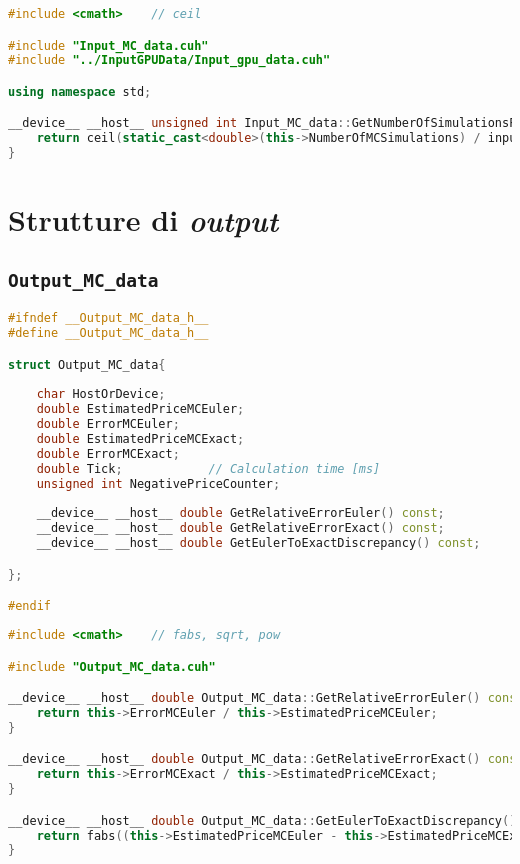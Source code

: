 \begin{lstlisting}[language=C++, caption={\texttt{libraries/InputStructures/InputMCData/Input\_MC\_data.cu}}]
#include <cmath>	// ceil

#include "Input_MC_data.cuh"
#include "../InputGPUData/Input_gpu_data.cuh"

using namespace std;

__device__ __host__ unsigned int Input_MC_data::GetNumberOfSimulationsPerThread(const Input_gpu_data& inputGPU) const{
	return ceil(static_cast<double>(this->NumberOfMCSimulations) / inputGPU.GetTotalNumberOfThreads());
}
\end{lstlisting}

\section{Strutture di \textit{output}}
\lipsum[1]

\subsection{\texttt{Output\_MC\_data}}
\lipsum[1-3]

\begin{lstlisting}[language=C++, caption={\texttt{libraries/OutputStructures/OutputMCData/Output\_MC\_data.cuh}}]
#ifndef __Output_MC_data_h__
#define __Output_MC_data_h__

struct Output_MC_data{
	
	char HostOrDevice;
	double EstimatedPriceMCEuler;
	double ErrorMCEuler;
	double EstimatedPriceMCExact;
	double ErrorMCExact;
	double Tick;			// Calculation time [ms]
	unsigned int NegativePriceCounter;
	
	__device__ __host__ double GetRelativeErrorEuler() const;
	__device__ __host__ double GetRelativeErrorExact() const;
	__device__ __host__ double GetEulerToExactDiscrepancy() const;

};

#endif
\end{lstlisting}

\begin{lstlisting}[language=C++, caption={\texttt{libraries/OutputStructures/OutputMCData/Output\_MC\_data.cu}}]
#include <cmath>	// fabs, sqrt, pow

#include "Output_MC_data.cuh"

__device__ __host__ double Output_MC_data::GetRelativeErrorEuler() const{
	return this->ErrorMCEuler / this->EstimatedPriceMCEuler;
}

__device__ __host__ double Output_MC_data::GetRelativeErrorExact() const{
	return this->ErrorMCExact / this->EstimatedPriceMCExact;
}

__device__ __host__ double Output_MC_data::GetEulerToExactDiscrepancy() const{
	return fabs((this->EstimatedPriceMCEuler - this->EstimatedPriceMCExact)/sqrt(pow(this->ErrorMCEuler,2)+pow(ErrorMCExact,2)));
}
\end{lstlisting}

